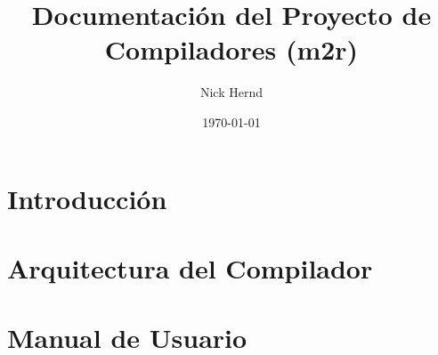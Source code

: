 \documentclass{report}
\title{Documentación del Proyecto de Compiladores (m2r)}
\author{Nick Hernd}
\date{\today}
\begin{document}
\maketitle
\tableofcontents

\chapter{Introducción}


\chapter{Arquitectura del Compilador}


\chapter{Manual de Usuario}

\end{document}
